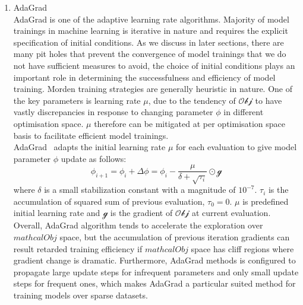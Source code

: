 \begin{enumerate}
    \item AdaGrad \\
AdaGrad is one of the adaptive learning rate algorithms. Majority of model trainings in machine learning is iterative in nature and requires the explicit specification of initial conditions. As we discuss in later sections, there are many pit holes that prevent the convergence of model trainings that we do not have sufficient measures to avoid, the choice of initial conditions plays an important role in determining the successfulness and efficiency of model training. Morden training strategies are generally heuristic in nature. One of the key parameters is learning rate $\mu$, due to the tendency of $\mathcal{Obj}$ to have vastly discrepancies in response to changing parameter $\phi$ in different optimisation space. $\mu$ therefore can be mitigated at per optimisation space basis to facilitate efficient model trainings. \\
AdaGrad~\cite{Duchi:2011} adapts the initial learning rate $\mu$ for each evaluation to give model parameter $\phi$ update as follows:
\begin{equation}
    \phi_{i+1} = \phi_{i} + \Delta \phi = \phi_i - \frac{\mu}{\delta + \sqrt{\tau_i}} \odot \mathcal{g}
\end{equation}
where $\delta$ is a small stabilization constant with a magnitude of $10^{-7}$. $\tau_i$ is the accumulation of squared sum of previous evaluation, $\tau_0 = 0$. $\mu$ is predefined initial learning rate and $\mathcal{g}$ is the gradient of $\mathcal{Obj}$ at current evaluation. \\ 
Overall, AdaGrad algorithm tends to accelerate the exploration over $mathcal{Obj}$ space, but the accumulation of previous iteration gradients can result retarded training efficiency if $mathcal{Obj}$ space has cliff regions where gradient change is dramatic. Furthermore, AdaGrad methods is configured to propagate large update steps for infrequent parameters and only small update steps for frequent ones, which makes AdaGrad a particular suited method for training models over sparse datasets. \\

\end{enumerate}

